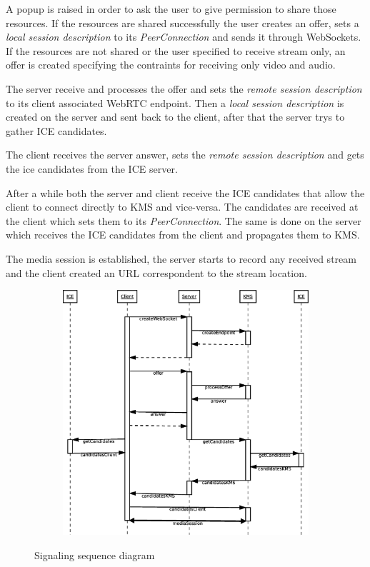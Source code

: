 A popup is raised in order to ask the user to give permission to share those resources. If the resources are shared successfully the user creates an offer, sets a \emph{local session description} to its \emph{PeerConnection} and sends it through WebSockets. If the resources are not shared or the user specified to receive stream only, an offer is created specifying the contraints for receiving only video and audio.

The server receive and processes the offer and sets the \emph{remote session description} to its client associated \ac{WebRTC} endpoint. Then a \emph{local session description} is created on the server and sent back to the client, after that the server trys to gather \ac{ICE} candidates.

The client receives the server answer, sets the \emph{remote session description} and gets the ice candidates from the \ac{ICE} server.

After a while both the server and client receive the \ac{ICE} candidates that allow the client to connect directly to \ac{KMS} and vice-versa. The candidates are received at the client which sets them to its \emph{PeerConnection}. The same is done on the server which receives the \ac{ICE} candidates from the client and propagates them to \ac{KMS}.

The media session is established, the server starts to record any received stream and the client created an \ac{URL} correspondent to the stream location.

\begin{figure}[H]
    \centering
    \begin{subfigure}[b]{\textwidth}
    	\includegraphics[width=\textwidth]{figures/signaling}
    \end{subfigure}
    \caption{Signaling sequence diagram}
\end{figure} 
